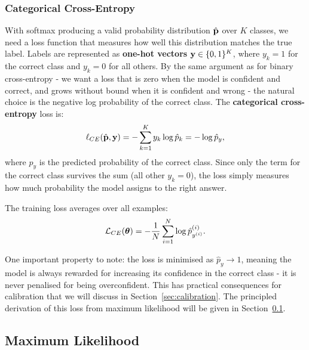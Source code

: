 \subsubsection{Categorical Cross-Entropy}

With softmax producing a valid probability distribution $\hat{\mathbf{p}}$ over $K$ classes, we need a loss function that measures how well this distribution matches the true label. Labels are represented as \textbf{one-hot vectors} $\mathbf{y} \in \{0,1\}^K$, where $y_k = 1$ for the correct class and $y_k = 0$ for all others. By the same argument as for binary cross-entropy - we want a loss that is zero when the model is confident and correct, and grows without bound when it is confident and wrong - the natural choice is the negative log probability of the correct class. The \textbf{categorical cross-entropy} loss is:
\begin{equation}
    \ell_{CE}(\hat{\mathbf{p}}, \mathbf{y}) = -\sum_{k=1}^{K} y_k \log \hat{p}_k = -\log \hat{p}_y,
\end{equation}
where $\hat{p}_y$ is the predicted probability of the correct class. Since only the term for the correct class survives the sum (all other $y_k = 0$), the loss simply measures how much probability the model assigns to the right answer.

The training loss averages over all examples:
\begin{equation}
    \mathcal{L}_{CE}(\boldsymbol{\theta}) = -\frac{1}{N} \sum_{i=1}^{N} \log \hat{p}_{y^{(i)}}^{(i)}.
\end{equation}

One important property to note: the loss is minimised as $\hat{p}_y \to 1$, meaning the model is always rewarded for increasing its confidence in the correct class - it is never penalised for being overconfident. This has practical consequences for calibration that we will discuss in Section~\ref{sec:calibration}.  The principled derivation of this loss from maximum likelihood will be given in Section~\ref{sec:mle}.

\subsection{Maximum Likelihood}\label{sec:mle}

